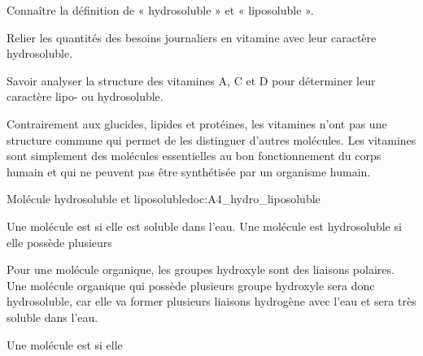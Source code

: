 \teteTermStssBiom



\begin{objectifs}
  \item Connaître la définition de « hydrosoluble » et « liposoluble ».
  \item Relier les quantités des besoins journaliers en vitamine avec leur caractère hydrosoluble.
  \item Savoir analyser la structure des vitamines A, C et D pour déterminer leur caractère lipo- ou hydrosoluble.
\end{objectifs}

\begin{contexte}
  Contrairement aux glucides, lipides et protéines, les vitamines n'ont pas une structure commune qui permet de les distinguer d'autres molécules.
  Les vitamines sont simplement des molécules essentielles au bon fonctionnement du corps humain et qui ne peuvent pas être synthétisée par un organisme humain.
  
\end{contexte}


\begin{doc}{Molécule hydrosoluble et liposoluble}{doc:A4_hydro_liposoluble}
  \begin{encart}
    Une molécule est  si elle est soluble dans l'eau.
    Une molécule est hydrosoluble si elle possède plusieurs 
  \end{encart}
  
  Pour une molécule organique, les groupes hydroxyle  sont des liaisons polaires.
  Une molécule organique qui possède plusieurs groupe hydroxyle sera donc hydrosoluble, car elle va former plusieurs liaisons hydrogène avec l'eau et sera très soluble dans l'eau.

  \begin{encart}
    Une molécule est  si elle 
  \end{encart}
\end{doc}

